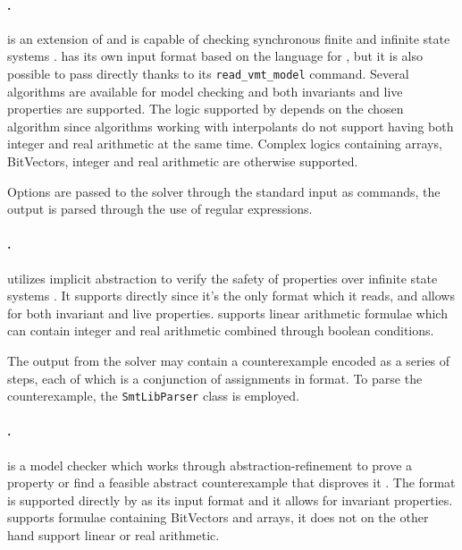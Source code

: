 \paragraph*{\nuxmv{}.}
\nuxmv{} is an extension of \nusmv{} \cite{DBLP:journals/sttt/CimattiCGR00} and is capable of checking synchronous finite and infinite state systems \cite{DBLP:conf/cav/CavadaCDGMMMRT14}.
\nuxmv{} has its own input format based on the language for \nusmv{}, but it is also possible to pass directly \vmtlib{} thanks to its \texttt{read\_vmt\_model} command.
Several algorithms are available for model checking and both invariants and live properties are supported.
The logic supported by \nuxmv{} depends on the chosen algorithm since algorithms working with interpolants do not support having both integer and real arithmetic at the same time.
Complex logics containing arrays, BitVectors, integer and real arithmetic are otherwise supported.

Options are passed to the solver through the standard input as commands, the output is parsed through the use of regular expressions.

\paragraph*{\iceia{}.}
\iceia{} utilizes implicit abstraction to verify the safety of properties over infinite state systems \cite{DBLP:conf/cav/DanielCGTM16}.
It supports \vmtlib{} directly since it's the only format which it reads, and allows for both invariant and live properties.
\iceia{} supports linear arithmetic formulae which can contain integer and real arithmetic combined through boolean conditions.

The output from the solver may contain a counterexample encoded as a series of steps, each of which is a conjunction of assignments in \smtlib{} format. To parse the counterexample, the \texttt{SmtLibParser} class is employed.

\paragraph*{\euforia{}.}
\euforia{} is a model checker which works through abstraction-refinement to prove a property or find a feasible abstract counterexample that disproves it \cite{DBLP:conf/vmcai/BuenoS19}.
The \vmtlib{} format is supported directly by \euforia{} as its input format and it allows for invariant properties.
\euforia{} supports formulae containing BitVectors and arrays, it does not on the other hand support linear or real arithmetic.

